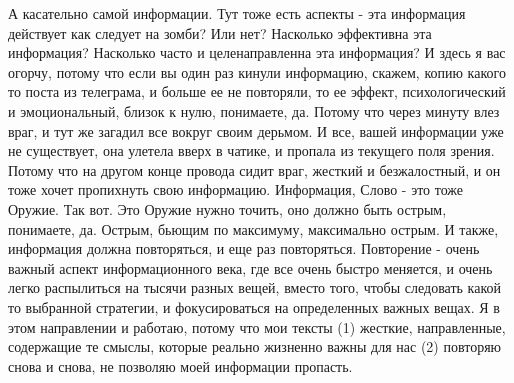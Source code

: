 А касательно самой информации. Тут тоже есть аспекты - эта информация действует
как следует на зомби? Или нет? Насколько эффективна эта информация? Насколько
часто и целенаправленна эта информация? И здесь я вас огорчу, потому что если
вы один раз кинули информацию, скажем, копию какого то поста из телеграма, и
больше ее не повторяли, то ее эффект, психологический и эмоциональный, близок к
нулю, понимаете, да. Потому что через минуту влез враг, и тут же загадил все
вокруг своим дерьмом. И все, вашей информации уже не существует, она улетела
вверх в чатике, и пропала из текущего поля зрения. Потому что на другом конце
провода сидит враг, жесткий и безжалостный, и он тоже хочет пропихнуть свою
информацию. Информация, Слово - это тоже Оружие. Так вот. Это Оружие нужно
точить, оно должно быть острым, понимаете, да. Острым, бьющим по максимуму,
максимально острым. И также, информация должна повторяться, и еще раз
повторяться. Повторение - очень важный аспект информационного века, где все
очень быстро меняется, и очень легко распылиться на тысячи разных вещей, вместо
того, чтобы следовать какой то выбранной стратегии, и фокусироваться на
определенных важных вещах. Я в этом направлении и работаю, потому что мои
тексты (1) жесткие, направленные, содержащие те смыслы, которые реально
жизненно важны для нас (2) повторяю снова и снова, не позволяю моей информации
пропасть.


